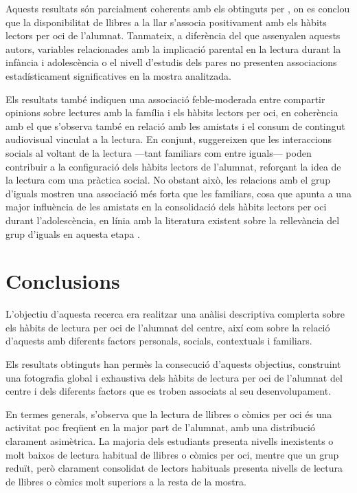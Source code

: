 \documentclass[12pt]{article}
\begin{document}
Aquests resultats són parcialment coherents amb els obtinguts per \textcite{shutaleva}, on es conclou que la disponibilitat de llibres a la llar s'associa positivament amb els hàbits lectors per oci de l'alumnat. Tanmateix, a diferència del que assenyalen aquests autors, variables relacionades amb la implicació parental en la lectura durant la infància i adolescència o el nivell d'estudis dels pares no presenten associacions estadísticament significatives en la mostra analitzada.

Els resultats també indiquen una associació feble-moderada entre compartir opinions sobre lectures amb la família i els hàbits lectors per oci, en coherència amb el que s’observa també en relació amb les amistats i el consum de contingut audiovisual vinculat a la lectura. En conjunt, suggereixen que les interaccions socials al voltant de la lectura ---tant familiars com entre iguals--- poden contribuir a la configuració dels hàbits lectors de l’alumnat, reforçant la idea de la lectura com una pràctica social. No obstant això, les relacions amb el grup d’iguals mostren una associació més forta que les familiars, cosa que apunta a una major influència de les amistats en la consolidació dels hàbits lectors per oci durant l’adolescència, en línia amb la literatura existent sobre la rellevància del grup d'iguals en aquesta etapa \parencite{arnett}.

\newpage
\section{Conclusions}
L'objectiu d'aquesta recerca era realitzar una anàlisi descriptiva complerta sobre els hàbits de lectura per oci de l'alumnat del centre, així com sobre la relació d'aquests amb diferents factors personals, socials, contextuals i familiars. 

Els resultats obtinguts han permès la consecució d'aquests objectius, construint una fotografia global i exhaustiva dels hàbits de lectura per oci de l'alumnat del centre i dels diferents factors que es troben associats al seu desenvolupament.

En termes generals, s’observa que la lectura de llibres o còmics per oci és una activitat poc freqüent en la major part de l'alumnat, amb una distribució clarament asimètrica. La majoria dels estudiants presenta nivells inexistents o molt baixos de lectura habitual de llibres o còmics per oci, mentre que un grup reduït, però clarament consolidat de lectors habituals presenta nivells de lectura de llibres o còmics molt superiors a la resta de la mostra.
\end{document}
